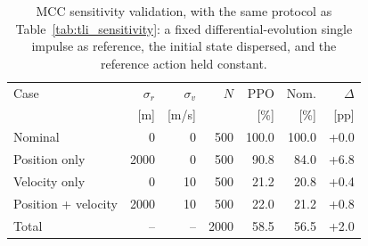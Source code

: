 \begin{table}[hbt!]
\centering
\small
\caption{MCC sensitivity validation, with the same protocol as Table~\ref{tab:tli_sensitivity}: a fixed differential-evolution single impulse as reference, the initial state dispersed, and the reference action held constant.}
\label{tab:mcc_sensitivity}
\begin{tabular}{lrrrrrr}
\toprule
Case & $\sigma_r$ & $\sigma_v$ & $N$ & PPO & Nom. & $\Delta$ \\
 & [m] & [m/s] & & [\%] & [\%] & [pp] \\
\midrule
Nominal & 0 & 0 & 500 & 100.0 & 100.0 & +0.0 \\
Position only & 2000 & 0 & 500 & 90.8 & 84.0 & +6.8 \\
Velocity only & 0 & 10 & 500 & 21.2 & 20.8 & +0.4 \\
Position + velocity & 2000 & 10 & 500 & 22.0 & 21.2 & +0.8 \\
\midrule
Total & -- & -- & 2000 & 58.5 & 56.5 & +2.0 \\
\bottomrule
\end{tabular}
\end{table}